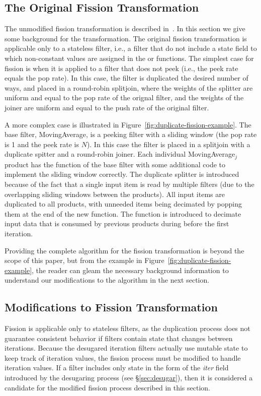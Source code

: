 \subsection{The Original Fission Transformation}

The unmodified fission transformation is described
in~\cite{streamit-asplos}. In this section we give some background for
the transformation. The original fission transformation is applicable
only to a stateless filter, i.e., a filter that do not include a state
field to which non-constant values are assigned in the \prework or
\work functions. The simplest case for fission is when it is applied
to a filter that does not peek (i.e., the peek rate equals the pop
rate). In this case, the filter is duplicated the desired number of
ways, and placed in a round-robin splitjoin, where the weights of the
splitter are uniform and equal to the pop rate of the orignal
filter, and the weights of the joiner are uniform and equal to the
push rate of the original filter.

A more complex case is illustrated in
Figure~\ref{fig:duplicate-fission-example}. The base filter,
MovingAverage, is a peeking filter with a sliding window (the pop rate
is 1 and the peek rate is $N$). In this case the filter is placed in a
splitjoin with a duplicate spitter and a round-robin joiner. Each
individual MovingAverage$_j$ product has the \work function of the
base filter with some additional code to implement the sliding window
correctly. The duplicate splitter is introduced because of the fact
that a single input item is read by multiple filters (due to the
overlapping sliding windows between the products). All input items are
duplicated to all products, with unneeded items being decimated by
popping them at the end of the new \work function.  The \prework
function is introduced to decimate input data that is consumed by
previous products during before the first iteration.  

Providing the complete algorithm for the fission transformation is
beyond the scope of this paper, but from the example
in Figure~\ref{fig:duplicate-fission-example}, the reader can
gleam the necessary background information to understand our
modifications to the algorithm in the next section.

\subsection{Modifications to Fission Transformation}

Fission is applicable only to stateless filters, as the duplication
process does not guarantee consistent behavior if filters contain
state that changes between iterations. Because the desugared iteration
filters actually use mutable state to keep track of iteration values,
the fission process must be modified to handle iteration values. If a
filter includes only state in the form of the {\it iter} field
introduced by the desugaring process (see \S\ref{sec:desugar}), then
it is considered a candidate for the modified fission process
described in this section.

